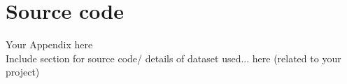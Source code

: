 \chapter{Source code}
Your Appendix here\\
Include section for source code/ details of dataset used... here (related to your project)